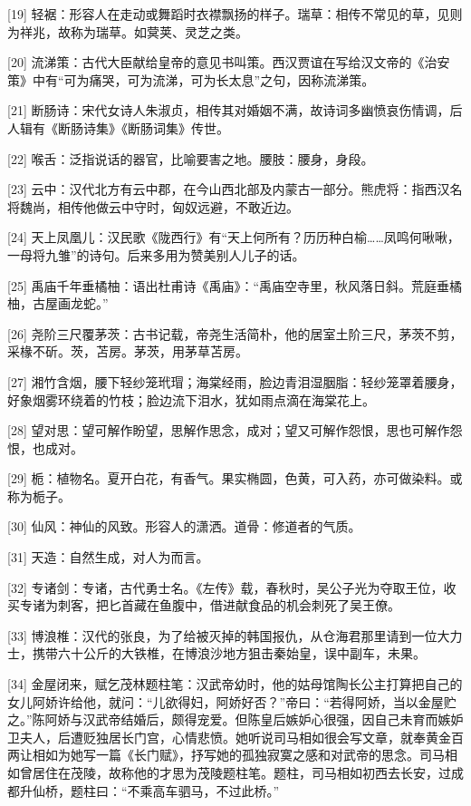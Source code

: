 \documentclass[12pt,UTF8]{ctexbook}
\begin{document}
[19] 轻裾：形容人在走动或舞蹈时衣襟飘扬的样子。瑞草：相传不常见的草，见则为祥兆，故称为瑞草。如蓂荚、灵芝之类。

[20] 流涕策：古代大臣献给皇帝的意见书叫策。西汉贾谊在写给汉文帝的《治安策》中有“可为痛哭，可为流涕，可为长太息”之句，因称流涕策。

[21] 断肠诗：宋代女诗人朱淑贞，相传其对婚姻不满，故诗词多幽愤哀伤情调，后人辑有《断肠诗集》《断肠词集》传世。

[22] 喉舌：泛指说话的器官，比喻要害之地。腰肢：腰身，身段。

[23] 云中：汉代北方有云中郡，在今山西北部及内蒙古一部分。熊虎将：指西汉名将魏尚，相传他做云中守时，匈奴远避，不敢近边。

[24] 天上凤凰儿：汉民歌《陇西行》有“天上何所有？历历种白榆……凤鸣何啾啾，一母将九雏”的诗句。后来多用为赞美别人儿子的话。

[25] 禹庙千年垂橘柚：语出杜甫诗《禹庙》：“禹庙空寺里，秋风落日斜。荒庭垂橘柚，古屋画龙蛇。”

[26] 尧阶三尺覆茅茨：古书记载，帝尧生活简朴，他的居室土阶三尺，茅茨不剪，采椽不斫。茨，苫房。茅茨，用茅草苫房。

[27] 湘竹含烟，腰下轻纱笼玳瑁；海棠经雨，脸边青泪湿胭脂：轻纱笼罩着腰身，好象烟雾环绕着的竹枝；脸边流下泪水，犹如雨点滴在海棠花上。

[28] 望对思：望可解作盼望，思解作思念，成对；望又可解作怨恨，思也可解作怨恨，也成对。

[29] 栀：植物名。夏开白花，有香气。果实椭圆，色黄，可入药，亦可做染料。或称为栀子。

[30] 仙风：神仙的风致。形容人的潇洒。道骨：修道者的气质。

[31] 天造：自然生成，对人为而言。

[32] 专诸剑：专诸，古代勇士名。《左传》载，春秋时，吴公子光为夺取王位，收买专诸为刺客，把匕首藏在鱼腹中，借进献食品的机会刺死了吴王僚。

[33] 博浪椎：汉代的张良，为了给被灭掉的韩国报仇，从仓海君那里请到一位大力士，携带六十公斤的大铁椎，在博浪沙地方狙击秦始皇，误中副车，未果。

[34] 金屋闭来，赋乞茂林题柱笔：汉武帝幼时，他的姑母馆陶长公主打算把自己的女儿阿娇许给他，就问：“儿欲得妇，阿娇好否？”帝曰：“若得阿娇，当以金屋贮之。”陈阿娇与汉武帝结婚后，颇得宠爱。但陈皇后嫉妒心很强，因自己未育而嫉妒卫夫人，后遭贬独居长门宫，心情悲愤。她听说司马相如很会写文章，就奉黄金百两让相如为她写一篇《长门赋》，抒写她的孤独寂寞之感和对武帝的思念。司马相如曾居住在茂陵，故称他的才思为茂陵题柱笔。题柱，司马相如初西去长安，过成都升仙桥，题柱曰：“不乘高车驷马，不过此桥。”
\end{document}
